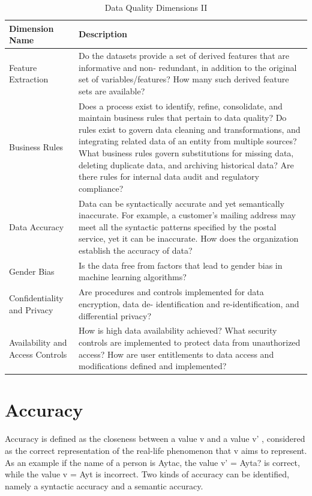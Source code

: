 \begin{table}
\caption{Data Quality Dimensions II}
\centering
\begin{tabular}{p{4.0cm} p{10cm}}
\toprule
\textbf{Dimension Name} & \textbf{Description} \\ 
\bottomrule
Feature Extraction & 
Do the datasets provide a set of derived features that are informative and non-
redundant, in addition to the original set of variables/features? How many such
derived feature sets are available? 
\\
Business Rules & 
Does a process exist to identify, refine, consolidate, and maintain business
rules that pertain to data quality? Do rules exist to govern data cleaning and
transformations, and integrating related data of an entity from multiple sources?
What business rules govern substitutions for missing data, deleting duplicate data,
and archiving historical data? Are there rules for internal data audit and regulatory
compliance? \\
Data Accuracy & 
Data can be syntactically accurate and yet semantically inaccurate. For example,
a customer's mailing address may meet all the syntactic patterns specified by the
postal service, yet it can be inaccurate. How does the organization establish the
accuracy of data? \\
Gender Bias & 
Is the data free from factors that lead to gender bias in machine learning
algorithms? \\
Confidentiality and Privacy & 
Are procedures and controls implemented for data encryption, data de-
identification and re-identification, and differential privacy? \\
Availability and Access Controls & 
How is high data availability achieved? What security controls are implemented to
protect data from unauthorized access? How are user entitlements to data access
and modifications defined and implemented? \\
\bottomrule
\end{tabular}
\end{table}


\section{Accuracy}

Accuracy is defined as the closeness between a value v and a value v' , considered as 
the correct representation of the real-life phenomenon that v aims to
represent. As an example if the name of a person is Aytac, the value v' = Ayta?
is correct, while the value v = Ayt is incorrect. Two kinds of accuracy can be
identified, namely a syntactic accuracy and a semantic accuracy.

